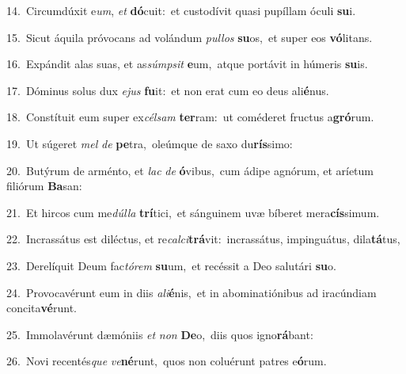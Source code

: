{\numbfont\textcolor{\numbcolor}{14.}}~Circumdúxit e\-\textit{um}\-, \textit{et} \textbf{dó}\-cuit:~\star et custodívit quasi pupíllam óculi \textbf{su}\-i.\par
{\numbfont\textcolor{\numbcolor}{15.}}~Sicut áquila próvocans ad volándum \textit{pul}\-\textit{los} \textbf{su}\-os,~\star et super eos \textbf{vó}\-litans.\par
{\numbfont\textcolor{\numbcolor}{16.}}~Expándit alas suas, et as\-\textit{súmp}\-\textit{sit} \textbf{e}\-um,~\star atque portávit in húmeris \textbf{su}\-is.\par
{\numbfont\textcolor{\numbcolor}{17.}}~Dóminus solus dux \textit{e}\-\textit{jus} \textbf{fu}\-it:~\star et non erat cum eo deus ali\-\textbf{é}\-nus.\par
{\numbfont\textcolor{\numbcolor}{18.}}~Constítuit eum super ex\-\textit{cél}\-\textit{sam} \textbf{ter}\-ram:~\star ut coméderet fructus a\-\textbf{gró}\-rum.\par
{\numbfont\textcolor{\numbcolor}{19.}}~Ut súgeret \textit{mel} \textit{de} \textbf{pe}\-tra,~\star oleúmque de saxo du\-\textbf{rís}\-simo:\par
{\numbfont\textcolor{\numbcolor}{20.}}~Butýrum de arménto, et \textit{lac} \textit{de} \textbf{ó}\-vibus,~\star cum ádipe agnórum, et aríetum filiórum \textbf{Ba}\-san:\par
{\numbfont\textcolor{\numbcolor}{21.}}~Et hircos cum me\-\textit{dúl}\-\textit{la} \textbf{trí}\-tici,~\star et sánguinem uvæ bíberet mera\-\textbf{cís}\-simum.\par
{\numbfont\textcolor{\numbcolor}{22.}}~Incrassátus est diléctus, et re\-\textit{cal}\-\textit{ci}\textbf{trá}vit:~\star incrassátus, impinguátus, dila\-\textbf{tá}\-tus,\par
{\numbfont\textcolor{\numbcolor}{23.}}~Derelíquit Deum fac\-\textit{tó}\-\textit{rem} \textbf{su}\-um,~\star et recéssit a Deo salutári \textbf{su}\-o.\par
{\numbfont\textcolor{\numbcolor}{24.}}~Provocavérunt eum in diis \textit{a}\-\textit{li}\textbf{é}nis,~\star et in abominatiónibus ad iracúndiam concita\-\textbf{vé}\-runt.\par
{\numbfont\textcolor{\numbcolor}{25.}}~Immolavérunt dæmóniis \textit{et} \textit{non} \textbf{De}\-o,~\star diis quos igno\-\textbf{rá}\-bant:\par
{\numbfont\textcolor{\numbcolor}{26.}}~Novi recentés\textit{que} \textit{ve}\-\textbf{né}runt,~\star quos non coluérunt patres e\-\textbf{ó}\-rum.\par
